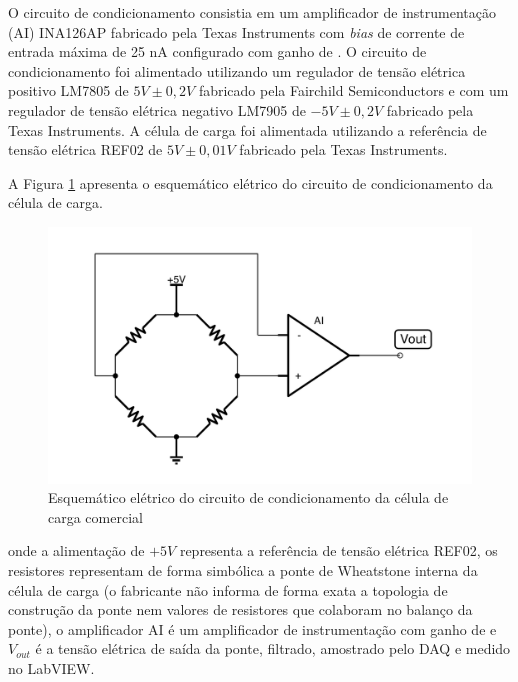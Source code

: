 \documentclass[a4paper]{instrumentacao}
\begin{document}
O circuito de condicionamento consistia em um amplificador de instrumentação (AI) INA126AP fabricado pela Texas Instruments com \textit{bias} de corrente de entrada máxima de 25 nA \cite{datasheet-ina126} configurado com ganho de . O circuito de condicionamento foi alimentado utilizando um regulador de tensão elétrica positivo LM7805 de $5V \pm 0,2V$ \cite{datasheet-lm7805} fabricado pela Fairchild Semiconductors e com um regulador de tensão elétrica negativo LM7905 de $-5V \pm 0,2V$ \cite{datasheet-lm7905} fabricado pela Texas Instruments. A célula de carga foi alimentada utilizando a referência de tensão elétrica REF02 de $5V \pm 0,01V$ \cite{datasheet-ref02} fabricado pela Texas Instruments.

A Figura \ref{fig:celula-comercial-metodologia-condicionamento} apresenta o esquemático elétrico do circuito de condicionamento da célula de carga.

\begin{figure}[H]
\center
\includegraphics[width=\textwidth]{Comercial-Circuito.pdf}
\caption{Esquemático elétrico do circuito de condicionamento da célula de carga comercial}
\label{fig:celula-comercial-metodologia-condicionamento}
\end{figure}

\noindent onde a alimentação de $+5V$ representa a referência de tensão elétrica REF02, os resistores representam de forma simbólica a ponte de Wheatstone interna da célula de carga (o fabricante não informa de forma exata a topologia de construção da ponte nem valores de resistores que colaboram no balanço da ponte), o amplificador AI é um amplificador de instrumentação com ganho de  e $V_{out}$ é a tensão elétrica de saída da ponte, filtrado, amostrado pelo DAQ e medido no LabVIEW.
\end{document}

